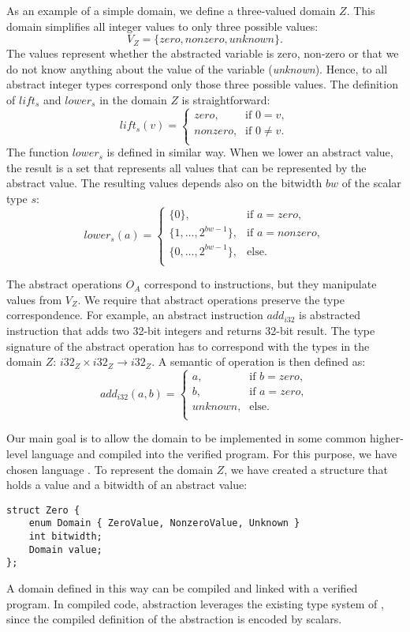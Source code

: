 As an example of a simple domain, we define a three-valued domain $Z$.
This domain simplifies all integer values to only three possible values:
\[ V_Z = \{ \textit{zero}, \textit{nonzero}, \textit{unknown} \}.\]
The values represent whether the abstracted variable is zero, non-zero or that
we do not know anything about the value of the variable (\emph{unknown}).
Hence, to all abstract integer types correspond only those three possible
values. The definition of $lift_s$ and $lower_s$ in the domain $Z$ is straightforward:
\[
  lift_s(v) =
  \begin{cases}
    \textit{zero},    & \text{if } 0 = v, \\
    \textit{nonzero}, & \text{if } 0 \not = v.\\
  \end{cases}
\]
The function $lower_s$ is defined in similar way. When we lower an
abstract value, the result is a set that represents all values that can be
represented by the abstract value. The resulting values depends also on the
bitwidth $bw$ of the scalar type $s$:
\[
  lower_s(a) =
  \begin{cases}
        \{0\},                            & \text{if } a = \textit{zero},\\
        \big\{1, \dots ,2^{bw - 1}\big\}, & \text{if } a = \textit{nonzero},\\
        \big\{0, \dots ,2^{bw - 1}\big\}, & \text{else}. \\
  \end{cases}
\]

The abstract operations $O_A$ correspond to \LLVM instructions, but they
manipulate values from $V_Z$. We require that abstract operations preserve the
type correspondence. For example, an abstract instruction $add_{i32}$ is
abstracted \LLVM instruction that adds two 32-bit integers and returns 32-bit
result. The type signature of the abstract operation has to correspond with the
types in the domain $Z$: ${i32}_Z \times {i32}_Z \to {i32}_Z$. A semantic of
operation is then defined as:
\[
    add_{i32}(a, b) =
  \begin{cases}
    a,      & \text{if } b = \textit{zero},\\
    b,      & \text{if } a = \textit{zero},\\
    \textit{unknown},   & \text{else}. \\
  \end{cases}
\]

Our main goal is to allow the domain to be implemented in some common higher-level
language and compiled into the verified program. For this purpose,
we have chosen language \Cpp{}. To represent the domain $Z$, we have created a
structure that holds a value and a bitwidth of an abstract value:
\begin{verbatim}
struct Zero {
    enum Domain { ZeroValue, NonzeroValue, Unknown }
    int bitwidth;
    Domain value;
};
\end{verbatim}
A domain defined in this way can be compiled and linked with a verified
program. In compiled code, abstraction leverages the existing type system of
\LLVM, since the compiled definition of the abstraction is encoded by \LLVM scalars.

